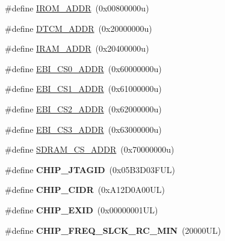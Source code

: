 \begin{DoxyCompactItemize}
\item 
\#define \mbox{\hyperlink{group__SAMV71N19__definitions_ga694212ffb8c2786bacee3d0ad6020bda}{I\+R\+O\+M\+\_\+\+A\+D\+DR}}~(0x00800000u)
\item 
\#define \mbox{\hyperlink{group__SAMV71N19__definitions_ga26626a425f7ebb3a0c2dbc276f0d9f78}{D\+T\+C\+M\+\_\+\+A\+D\+DR}}~(0x20000000u)
\item 
\#define \mbox{\hyperlink{group__SAMV71N19__definitions_gaae45ac2ef16942159481c767ac4805cf}{I\+R\+A\+M\+\_\+\+A\+D\+DR}}~(0x20400000u)
\item 
\#define \mbox{\hyperlink{group__SAMV71N19__definitions_ga9bcbb97ddae3b2cc5e2c9613d33f66b4}{E\+B\+I\+\_\+\+C\+S0\+\_\+\+A\+D\+DR}}~(0x60000000u)
\item 
\#define \mbox{\hyperlink{group__SAMV71N19__definitions_gaaddd9fdbbc77c9aced5308819f502a26}{E\+B\+I\+\_\+\+C\+S1\+\_\+\+A\+D\+DR}}~(0x61000000u)
\item 
\#define \mbox{\hyperlink{group__SAMV71N19__definitions_ga058a35f9991487dc2dd12ada792d0730}{E\+B\+I\+\_\+\+C\+S2\+\_\+\+A\+D\+DR}}~(0x62000000u)
\item 
\#define \mbox{\hyperlink{group__SAMV71N19__definitions_gad66ebdd0fc33ec3cf85dbaa14bbf05d9}{E\+B\+I\+\_\+\+C\+S3\+\_\+\+A\+D\+DR}}~(0x63000000u)
\item 
\#define \mbox{\hyperlink{group__SAMV71N19__definitions_ga61b7db25daf759c2a2beb6e5a0b57a84}{S\+D\+R\+A\+M\+\_\+\+C\+S\+\_\+\+A\+D\+DR}}~(0x70000000u)
\item 
\mbox{\label{group__SAMV71N19__definitions_gaa614519778eec0df55d3eeab3223e3f6}} 
\#define {\bfseries C\+H\+I\+P\+\_\+\+J\+T\+A\+G\+ID}~(0x05\+B3\+D03\+F\+U\+L)
\item 
\mbox{\label{group__SAMV71N19__definitions_ga1e1ae44dd9269a8a98c1d7e7a60e9fbd}} 
\#define {\bfseries C\+H\+I\+P\+\_\+\+C\+I\+DR}~(0x\+A12\+D0\+A00\+U\+L)
\item 
\mbox{\label{group__SAMV71N19__definitions_ga35123717aa86b76bb6b73cf3adc4c2e6}} 
\#define {\bfseries C\+H\+I\+P\+\_\+\+E\+X\+ID}~(0x00000001\+U\+L)
\item 
\mbox{\label{group__SAMV71N19__definitions_ga0e868bf27426399dfdcb3a9dfc3733c4}} 
\#define {\bfseries C\+H\+I\+P\+\_\+\+F\+R\+E\+Q\+\_\+\+S\+L\+C\+K\+\_\+\+R\+C\+\_\+\+M\+IN}~(20000\+U\+L)

\end{DoxyCompactItemize}
